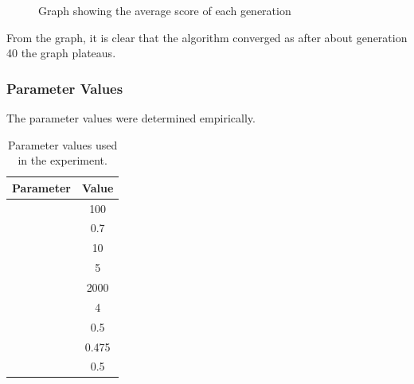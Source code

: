 \documentclass[a4paper,12pt]{article}
\begin{document}
{\begin{figure}[h!]
\begin{center}
                    \end{center}
                    \caption{Graph showing the average score of each generation}
                \end{figure} 
                \noindent From the graph, it is clear that the algorithm converged as after about generation 40 the graph plateaus. 
                
            } 
        \subsubsection*{Parameter Values}
            \par{
                The parameter values were determined empirically.
                \begin{table}[h!]
                    \centering
                        \small 
                        \begin{tabular}{ | l | c | }

                            \hline
                            \textbf{Parameter} & \textbf{Value} \\
                            \hline  
                            \nameref{subsubsec:mg} & 100 \\ 
                            \nameref{subsubsec:kf} & 0.7 \\ 
                            \nameref{subsubsec:mmd} & 10 \\ 
                            \nameref{subsubsec:cmd} & 5 \\ 
                            \nameref{subsubsec:ps} & 2000 \\ 
                            \nameref{subsubsec:ts} & 4 \\ 
                            \nameref{subsubsec:car} & 0.5 \\ 
                            \nameref{subsubsec:mar} & 0.475 \\ 
                            \nameref{subsubsec:har} & 0.5 \\
                            \hline 
                        \end{tabular}
                        \caption{Parameter values used in the experiment.} 
                \end{table} 
            }
       
\end{document}
